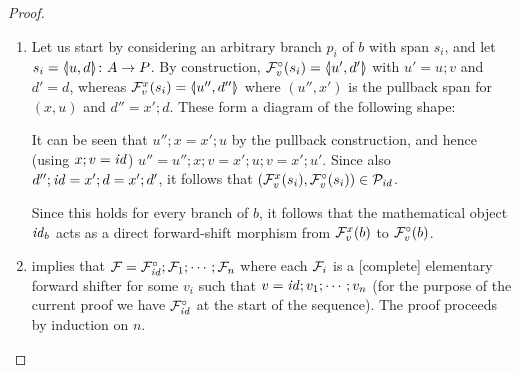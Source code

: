 \begin{proof}
\begin{enumerate}[topsep=\smallskipamount]
\item Let us start by considering an arbitrary branch $p_i$ of $b$ with span $s_i$, and let $s_i=\spanof{u}{d}\of A\to P$. By construction, $\dF v(s_i)=\spanof{u'}{d'}$ with $u'=u;v$ and $d'=d$, whereas $\rF v x(s_i)=\spanof{u''}{d''}$ where $(u'',x')$ is the pullback span for $(x,u)$ and $d''=x';d$. These form a diagram of the following shape:
\begin{center}
\end{center}
It can be seen that $u'';x=x';u$ by the pullback construction, and hence (using $x;v=\id$) $u''=u'';x;v=x';u;v=x';u'$. Since also $d'';\id=x';d=x';d'$, it follows that $(\rF v x(s_i),\dF v(s_i))\in \cP_\id$.

Since this holds for every branch of $b$, it follows that the mathematical object $\id_b$ acts as a direct forward-shift morphism from $\rF v x(b)$ to $\dF v(b)$.

\item {} implies that $\cF=\dF\id;\cF_1;\cdots;\cF_n$ where each $\cF_i$ is a [complete] elementary forward shifter for some $v_i$ such that $v=\id;v_1;\cdots;v_n$ (for the purpose of the current proof we have $\dF\id$ at the start of the sequence). The proof proceeds by induction on $n$.


\end{enumerate}
\end{proof}
